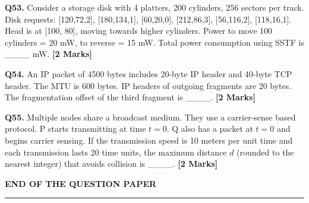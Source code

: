 \documentclass[11pt]{article}
\newcommand{\questionb}[2]{
    \noindent\textbf{Q#2.} #1 \hfill \textbf{[2 Marks]}
}
\begin{document}
\questionb{Consider a storage disk with 4 platters, 200 cylinders, 256 sectors per track. Disk requests: [120,72,2], [180,134,1], [60,20,0], [212,86,3], [56,116,2], [118,16,1]. Head is at [100, 80], moving towards higher cylinders. Power to move 100 cylinders = 20 mW, to reverse = 15 mW. Total power consumption using SSTF is \_\_\_\_ mW.}{53}
\vspace{0.5cm}

\questionb{An IP packet of 4500 bytes includes 20-byte IP header and 40-byte TCP header. The MTU is 600 bytes. IP headers of outgoing fragments are 20 bytes. The fragmentation offset of the third fragment is \_\_\_\_.}{54}
\vspace{0.5cm}

\questionb{Multiple nodes share a broadcast medium. They use a carrier-sense based protocol. P starts transmitting at time \( t = 0 \). Q also has a packet at \( t = 0 \) and begins carrier sensing. If the transmission speed is 10 meters per unit time and each transmission lasts 20 time units, the maximum distance \( d \) (rounded to the nearest integer) that avoids collision is \_\_\_\_.}{55}
\vspace{0.5cm}




\vspace{5cm}
\begin{center}
\textbf{END OF THE QUESTION PAPER} \\
\rule{\textwidth}{0.5pt}
\end{center}
\end{document}
